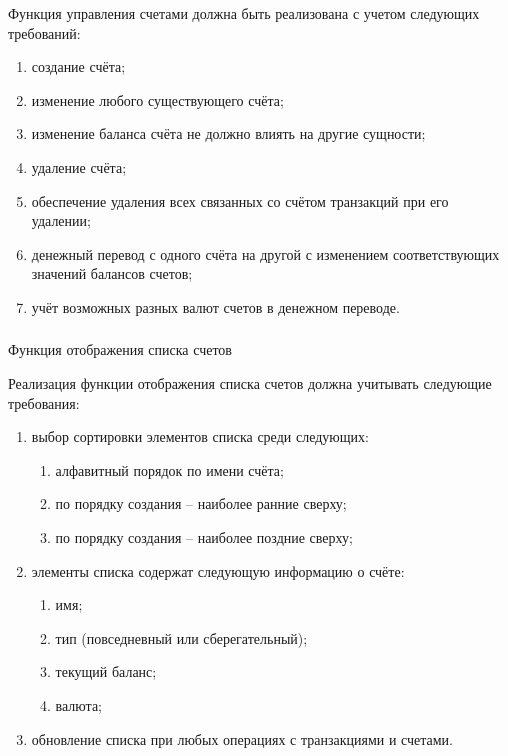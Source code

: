 Функция управления счетами должна быть реализована с учетом следующих требований:
\begin{enumerate}
    \item создание счёта;
    \item изменение любого существующего счёта;
    \item изменение баланса счёта не должно влиять на другие сущности;
    \item удаление счёта;
    \item обеспечение удаления всех связанных со счётом транзакций при его удалении;
    \item денежный перевод с одного счёта на другой с изменением соответствующих значений балансов счетов;
    \item учёт возможных разных валют счетов в денежном переводе.
\end{enumerate}

\subsubsection{} Функция отображения списка счетов
\label{sec:domain:specification:wallets_list}

Реализация функции отображения списка счетов должна учитывать следующие требования:

\begin{enumerate}
    \item выбор сортировки элементов списка среди следующих:
    \begin{enumerate}
        \item алфавитный порядок по имени счёта;
        \item по порядку создания -- наиболее ранние сверху;
        \item по порядку создания -- наиболее поздние сверху;
    \end{enumerate}
    \item элементы списка содержат следующую информацию о счёте:
    \begin{enumerate}
        \item имя;
        \item тип (повседневный или сберегательный);
        \item текущий баланс;
        \item валюта;
    \end{enumerate}
    \item обновление списка при любых операциях с транзакциями и счетами.
\end{enumerate}

